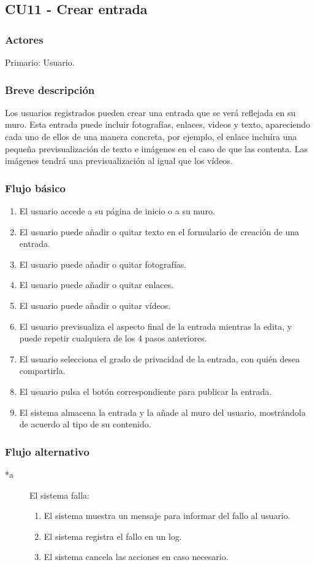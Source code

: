 \documentclass[12pt, a4paper, titlepage]{article}
\begin{document}
\subsection{CU11 - Crear entrada}
\subsubsection{Actores}
Primario: Usuario.
\subsubsection{Breve descripción}
Los usuarios registrados pueden crear una entrada que se verá reflejada en su muro. Esta entrada puede incluir fotografías, enlaces, videos y texto, apareciendo cada uno de ellos de una manera concreta, por ejemplo, el enlace incluíra una pequeña previsualización de texto e imágenes en el caso de que las contenta. Las imágenes tendrá una previsualización al igual que los vídeos.
\subsubsection{Flujo básico}
\begin{enumerate}
	\item El usuario accede a su página de inicio o a su muro.
	\item El usuario puede añadir o quitar texto en el formulario de creación de una entrada.
	\item El usuario puede añadir o quitar fotografías.
	\item El usuario puede añadir o quitar enlaces.
	\item El usuario puede añadir o quitar vídeos.
	\item El usuario previsualiza el aspecto final de la entrada mientras la edita, y puede repetir cualquiera de los 4 pasos anteriores.
	\item El usuario selecciona el grado de privacidad de la entrada, con quién desea compartirla.
	\item El usuario pulsa el botón correspondiente para publicar la entrada.
	\item El sistema almacena la entrada y la añade al muro del usuario, mostrándola de acuerdo al tipo de su contenido.
\end{enumerate}
\subsubsection{Flujo alternativo}

\begin{description}
	\item [*a] El sistema falla:
	\begin{enumerate}
		\item El sistema muestra un mensaje para informar del fallo al usuario.
		\item El sistema registra el fallo en un log.
		\item El sistema cancela las acciones en caso necesario.
	\end{enumerate}
\end{description}
\end{document}
